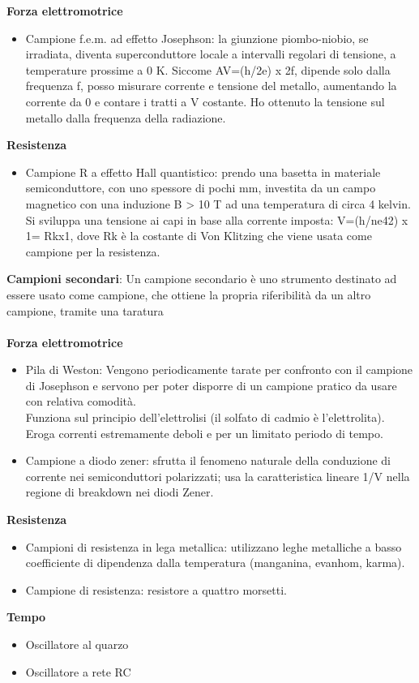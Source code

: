 \documentclass{article}
\begin{document}
\textbf{Forza elettromotrice }
\begin{itemize}
    \item Campione f.e.m. ad effetto Josephson: la giunzione piombo-niobio, se irradiata, diventa superconduttore locale a intervalli regolari di tensione, a temperature prossime a 0 K. 
    Siccome AV=(h/2e) x 2f, dipende solo dalla frequenza f, posso misurare corrente e tensione del metallo, aumentando la corrente da 0 e contare i tratti a V costante. Ho ottenuto la tensione sul 
    metallo dalla frequenza della radiazione. 
\end{itemize}
\textbf{Resistenza} 
\begin{itemize}
     \item Campione R a effetto Hall quantistico: prendo una basetta in materiale semiconduttore, con uno spessore di pochi mm, investita da un campo magnetico con una induzione B > 10 T ad una temperatura di circa 4 kelvin. Si sviluppa una tensione ai capi in base alla corrente imposta: V=(h/ne42) x 1= Rkx1, dove Rk è la costante di Von Klitzing che viene usata come 
    campione per la resistenza. 
    \end{itemize}
\textbf{Campioni secondari}: Un campione secondario è uno strumento destinato ad essere usato come campione, che ottiene la propria riferibilità da un altro campione, tramite una taratura \\ \\
\textbf{Forza elettromotrice}
\begin{itemize}
    \item Pila di Weston: Vengono periodicamente tarate per confronto con il campione di Josephson 
e servono per poter disporre di un campione pratico da usare con relativa comodità. \\
Funziona sul principio dell’elettrolisi (il solfato di cadmio è l’elettrolita).\\ Eroga correnti 
estremamente deboli e per un limitato periodo di tempo. 
    \item Campione a diodo zener: sfrutta il fenomeno naturale della conduzione di corrente nei 
semiconduttori polarizzati; usa la caratteristica lineare 1/V nella regione di breakdown nei 
diodi Zener. 
\end{itemize}
\textbf{Resistenza }
\begin{itemize}
    \item Campioni di resistenza in lega metallica: utilizzano leghe metalliche a basso coefficiente di 
dipendenza dalla temperatura (manganina, evanhom, karma).
    \item Campione di resistenza: resistore a quattro morsetti.
\end{itemize}
\textbf{Tempo}
\begin{itemize}
    \item Oscillatore al quarzo 
    \item Oscillatore a rete RC
\end{itemize}
\end{document}
